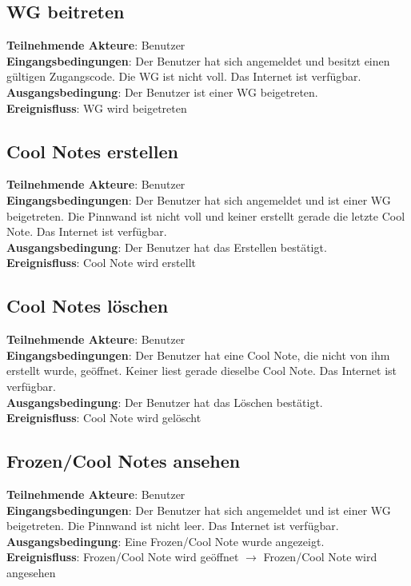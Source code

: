 \documentclass[a4paper]{scrreprt}
\begin{document}
        	\subsection{WG beitreten}
        	\textbf{Teilnehmende Akteure}: Benutzer \\
        	\textbf{Eingangsbedingungen}: Der Benutzer hat sich angemeldet und besitzt einen gültigen Zugangscode. Die WG ist nicht voll. Das Internet ist verfügbar. \\
        	\textbf{Ausgangsbedingung}: Der Benutzer ist einer WG beigetreten. \\
        	\textbf{Ereignisfluss}: WG wird beigetreten
        	
        	\subsection{Cool Notes erstellen}
        	\textbf{Teilnehmende Akteure}: Benutzer \\
        	\textbf{Eingangsbedingungen}: Der Benutzer hat sich angemeldet und ist einer WG beigetreten. Die Pinnwand ist nicht voll und keiner erstellt gerade die letzte Cool Note. Das Internet ist verfügbar. \\
        	\textbf{Ausgangsbedingung}: Der Benutzer hat das Erstellen bestätigt. \\
        	\textbf{Ereignisfluss}: Cool Note wird erstellt
        	
        	\subsection{Cool Notes löschen}
        	\textbf{Teilnehmende Akteure}: Benutzer \\
        	\textbf{Eingangsbedingungen}: Der Benutzer hat eine Cool Note, die nicht von ihm erstellt wurde, geöffnet. Keiner liest gerade dieselbe Cool Note. Das Internet ist verfügbar. \\
        	\textbf{Ausgangsbedingung}: Der Benutzer hat das Löschen bestätigt. \\
        	\textbf{Ereignisfluss}: Cool Note wird gelöscht
        	
        	\subsection{Frozen/Cool Notes ansehen}
        	\textbf{Teilnehmende Akteure}: Benutzer \\
        	\textbf{Eingangsbedingungen}: Der Benutzer hat sich angemeldet und ist einer WG beigetreten. Die Pinnwand ist nicht leer. Das Internet ist verfügbar. \\
        	\textbf{Ausgangsbedingung}: Eine Frozen/Cool Note wurde angezeigt. \\
        	\textbf{Ereignisfluss}: Frozen/Cool Note wird geöffnet $\rightarrow$ Frozen/Cool Note wird angesehen
        	
\end{document}
